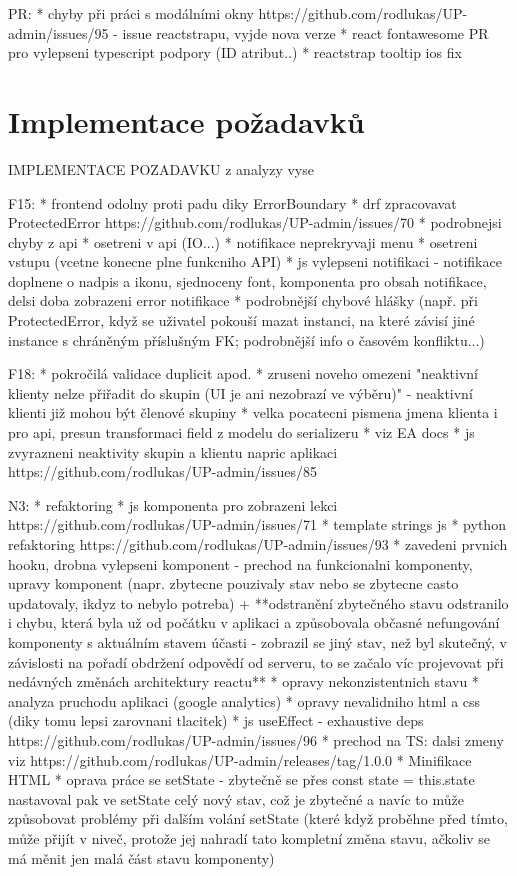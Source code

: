 
PR:
* chyby při práci s modálními okny https://github.com/rodlukas/UP-admin/issues/95 - issue reactstrapu, vyjde nova verze
* react fontawesome PR pro vylepseni typescript podpory (ID atribut..)
* reactstrap tooltip ios fix

\section{Implementace požadavků}
IMPLEMENTACE POZADAVKU z analyzy vyse

F15:
* frontend odolny proti padu diky ErrorBoundary
* drf zpracovavat ProtectedError https://github.com/rodlukas/UP-admin/issues/70
* podrobnejsi chyby z api
* osetreni v api (IO...)
* notifikace neprekryvaji menu
* osetreni vstupu (vcetne konecne plne funkcniho API)
* js vylepseni notifikaci - notifikace doplnene o nadpis a ikonu, sjednoceny font, komponenta pro obsah notifikace, delsi doba zobrazeni error notifikace
* podrobnější chybové hlášky (např. při ProtectedError, když se uživatel pokouší mazat instanci, na které závisí jiné instance s chráněným příslušným FK; podrobnější info o časovém konfliktu...)

F18:
* pokročilá validace duplicit apod.
* zruseni noveho omezeni "neaktivní klienty nelze přiřadit do skupin (UI je ani nezobrazí ve výběru)" - neaktivní klienti již mohou být členové skupiny
* velka pocatecni pismena jmena klienta i pro api, presun transformaci field z modelu do serializeru
* viz EA docs
* js zvyrazneni neaktivity skupin a klientu napric aplikaci https://github.com/rodlukas/UP-admin/issues/85

N3:
* refaktoring
* js komponenta pro zobrazeni lekci https://github.com/rodlukas/UP-admin/issues/71
* template strings js
* python refaktoring https://github.com/rodlukas/UP-admin/issues/93
* zavedeni prvnich hooku, drobna vylepseni komponent - prechod na funkcionalni komponenty, upravy komponent (napr. zbytecne pouzivaly stav nebo se zbytecne casto updatovaly, ikdyz to nebylo potreba) + **odstranění zbytečného stavu odstranilo i chybu, která byla už od počátku v aplikaci a způsobovala občasné nefungování komponenty s aktuálním stavem účasti - zobrazil se jiný stav, než byl skutečný, v závislosti na pořadí obdržení odpovědí od serveru, to se začalo víc projevovat při nedávných změnách architektury reactu**
* opravy nekonzistentnich stavu
* analyza pruchodu aplikaci (google analytics)
* opravy nevalidniho html a css (diky tomu lepsi zarovnani tlacitek)
*  js useEffect - exhaustive deps https://github.com/rodlukas/UP-admin/issues/96
* prechod na TS: dalsi zmeny viz https://github.com/rodlukas/UP-admin/releases/tag/1.0.0
* Minifikace HTML
* oprava práce se setState - zbytečně se přes const state = this.state nastavoval pak ve setState celý nový stav, což je zbytečné a navíc to může způsobovat problémy při dalším volání setState (které když proběhne před tímto, může přijít v niveč, protože jej nahradí tato kompletní změna stavu, ačkoliv se má měnit jen malá část stavu komponenty) 

